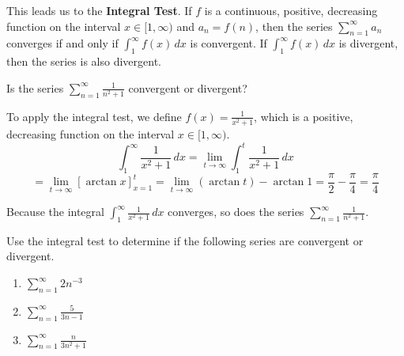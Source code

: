 \begin{mdframed}[frametitle = {The Integral Test}, style = important]
This leads us to the \textbf{Integral Test}. If $f$ is a continuous, positive, 
decreasing function on the interval $x \in [1, \infty)$ and $a_n = f(n)$, then 
the series $\sum_{n=1}^\infty a_n$ converges if and only if $\int_1^\infty 
f(x)\,dx$ is convergent. If $\int_1^\infty f(x)\,dx$ is
divergent, then the series is also divergent.
\end{mdframed}

\begin{Worked}
\begin{Problem}
Is the series $\sum_{n = 1}^\infty \frac{1}{n^2 + 1}$
convergent or divergent?
\end{Problem}
\begin{Solution}
To apply the integral test, we define $f(x) = 
\frac{1}{x^2 + 1}$, which is a positive, decreasing function on the interval 
$x \in [1, \infty)$. 
$$\int_1^\infty \frac{1}{x^2 + 1}\,dx = \lim_{t \to \infty} \int_{1}^t 
\frac{1}{x^2 + 1}\,dx$$
$$= \lim_{t \to \infty} \left[ \arctan{x} \right]_{x = 1}^t = \lim_{t \to \infty} 
\left( \arctan{t} \right) - \arctan{1} = \frac{\pi}{2} - \frac{\pi}{4} = 
\frac{\pi}{4}$$

Because the integral $\int_1^\infty \frac{1}{x^2 + 1}\,dx$ converges, so does 
the series $\sum_{n = 1}^\infty \frac{1}{n^2 + 1}$. 
\end{Solution}
\end{Worked}

\begin{Exercise}[label = series1]
Use the integral test to determine if the following series are convergent or 
divergent. 
\begin{enumerate}
\item $\sum_{n = 1}^\infty 2n^{-3}$
\item $\sum_{n = 1}^\infty \frac{5}{3n-1}$
\item $\sum_{n = 1}^\infty \frac{n}{3n^2 + 1}$
\end{enumerate}
\vspace{40mm}
\end{Exercise}

